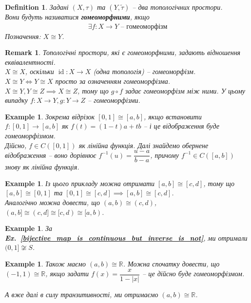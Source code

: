 \documentclass[a4paper, 10pt]{article}
\theoremstyle{theoremdd}
\newtheorem{definition}[theorem]{Definition}
\newtheorem{example}[theorem]{Example}
\newtheorem{remark}[theorem]{Remark}
\newcommand\exref[1]{\textbf{Ex.~\ref{#1}}}
\DeclareMathOperator{\id}{id}
\begin{document}
\begin{definition}
Задані $(X,\tau)$ та $(Y,\tilde{\tau})$ -- два топологічних простори.\\
Вони будуть називатися \textbf{гомеоморфними}, якщо
\begin{align*}
\exists f \colon X \to Y \text{ -- гомеоморфізм}
\end{align*}
Позначення: $X \cong Y$.
\end{definition}

\begin{remark}
Топологічні простори, які є гомеоморфними, задають відношення еквівалентності.\\
$X \cong X$, оскільки $\id \colon X \to X$ (одна топологія) -- гомеоморфізм.\\
$X \cong Y \iff Y \cong X$ просто за означенням гомеоморфізма.\\
$X \cong Y, Y \cong Z \implies X \cong Z$, тому що $g \circ f$ задає гомеоморфізм між ними. У цьому випадку $f \colon X \to Y, g \colon Y \to Z$ -- гомеоморфізми.
\end{remark}

\begin{example}
Зокрема відрізок $[0,1] \cong [a,b]$, якщо встановити $f \colon [0,1] \to [a,b]$ як $f(t) = (1-t)a + tb$ -- і це відображення буде гомеоморфізмом.\\
Дійсно, $f \in C([0,1])$ як лінійна функція. Далі знайдемо обернене відображення -- воно дорівнює $f^{-1}(u) = \dfrac{u-a}{b-a}$, причому $f^{-1} \in C([a,b])$ знову як лінійна функція.
\end{example}

\begin{example}
Із цього прикладу можна отримати $[a,b] \cong [c,d]$, тому що\\
$[a,b] \cong [0,1]$ та $[0,1] \cong [c,d] \implies [a,b] \cong [c,d]$.
\bigskip \\
Аналогічно можна довести, що $(a,b) \cong (c,d)$, \quad $(a,b] \cong (c,d] \cong [c,d) \cong [a,b)$.
\end{example}

\begin{example}
За \exref{bijective_map_is_continuous_but_inverse_is_not}, ми отримали $(0,1] \not\cong S$.
\end{example}

\begin{example}
Також маємо $(a,b) \cong \mathbb{R}$. Можна спочатку довести, що $(-1,1) \cong \mathbb{R}$, якщо задати $f(x) = \dfrac{x}{1-|x|}$ -- це дійсно буде гомеоморфізмом.
\begin{figure}[H]
\centering
{}
\end{figure}
\noindent
А вже далі в силу транзитивності, ми отримаємо $(a,b) \cong \mathbb{R}$.
\end{example}
\end{document}
